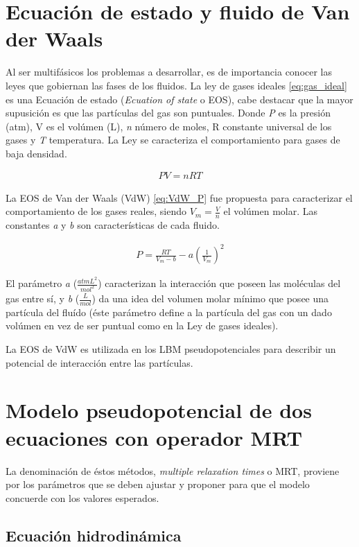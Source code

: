 \section{Ecuación de estado y fluido de Van der Waals}

Al ser multifásicos los problemas a desarrollar, es de importancia conocer las leyes que gobiernan las fases de los fluidos. La ley de gases ideales \ref{eq:gas_ideal} es una Ecuación de estado (\textit{Ecuation of state} o EOS), cabe destacar que la mayor supusición es que las partículas del gas son puntuales. Donde \textit{P} es la presión (atm), V es el volúmen (L), \textit{n} número de moles, R constante universal de los gases y \textit{T} temperatura. La Ley se  caracteriza el comportamiento para gases de baja densidad.

\begin{align}
P V = n R T
\label{eq:gas_ideal}
\end{align}

La EOS de Van der Waals (VdW) \ref{eq:VdW_P} fue propuesta para caracterizar el comportamiento de los gases reales, siendo $V_m = \frac{V}{n}$ el volúmen molar. Las constantes \textit{a} y \textit{b} son características de cada fluido.

\begin{align}
P = \frac{R T}{V_m - b} - a {(\frac{1}{V_m})}^2
\label{eq:VdW_P}
\end{align}

El parámetro \textit{a}  ($\frac{atm L^2}{mol^2}$) caracterizan la interacción que poseen las moléculas del gas entre sí, y \textit{b} ($\frac{L}{mol}$) da una idea del volumen molar mínimo que posee una partícula del fluído (éste parámetro define a la partícula del gas con un dado volúmen en vez de ser puntual como en la Ley de gases ideales).

La EOS de VdW es utilizada en los LBM pseudopotenciales para describir un potencial de interacción entre las partículas.



\section{Modelo pseudopotencial de dos ecuaciones con operador MRT}

La denominación de éstos métodos, \textit{multiple relaxation times} o MRT, proviene por los parámetros que se deben ajustar y proponer para que el modelo concuerde con los valores esperados.

\subsection{Ecuación hidrodinámica}


